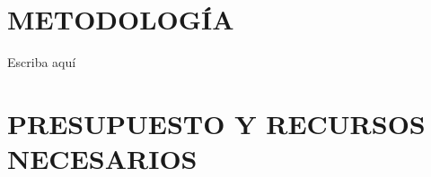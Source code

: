\documentclass[12pt,letterpaper]{article}
\begin{document}
\section{METODOLOGÍA}


Escriba aquí

\section{PRESUPUESTO Y RECURSOS NECESARIOS}

\end{document}
